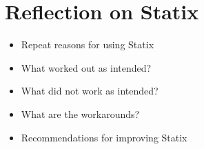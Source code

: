   \section{\label{sec:statix-reflection}Reflection on Statix}

    \begin{itemize}
      \item Repeat reasons for using Statix
      \item What worked out as intended?
      \item What did not work as intended?
      \item What are the workarounds?
      \item Recommendations for improving Statix
    \end{itemize}
